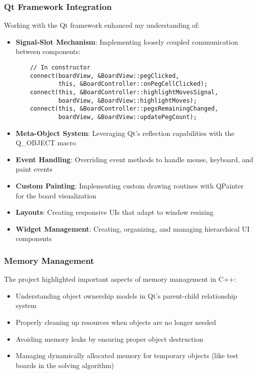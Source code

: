 \subsubsection{Qt Framework Integration}
Working with the Qt framework enhanced my understanding of:

\begin{itemize}
    \item \textbf{Signal-Slot Mechanism}: Implementing loosely coupled communication between components:
    
    \begin{verbatim}
    // In constructor
    connect(boardView, &BoardView::pegClicked, 
            this, &BoardController::onPegCellClicked);
    connect(this, &BoardController::highlightMovesSignal, 
            boardView, &BoardView::highlightMoves);
    connect(this, &BoardController::pegsRemainingChanged, 
            boardView, &BoardView::updatePegCount);
    \end{verbatim}
    
    \item \textbf{Meta-Object System}: Leveraging Qt's reflection capabilities with the Q\_OBJECT macro
    \item \textbf{Event Handling}: Overriding event methods to handle mouse, keyboard, and paint events
    \item \textbf{Custom Painting}: Implementing custom drawing routines with QPainter for the board visualization
    \item \textbf{Layouts}: Creating responsive UIs that adapt to window resizing
    \item \textbf{Widget Management}: Creating, organizing, and managing hierarchical UI components
\end{itemize}

\subsubsection{Memory Management}
The project highlighted important aspects of memory management in C++:

\begin{itemize}
    \item Understanding object ownership models in Qt's parent-child relationship system
    \item Properly cleaning up resources when objects are no longer needed
    \item Avoiding memory leaks by ensuring proper object destruction
    \item Managing dynamically allocated memory for temporary objects (like test boards in the solving algorithm)
\end{itemize}

